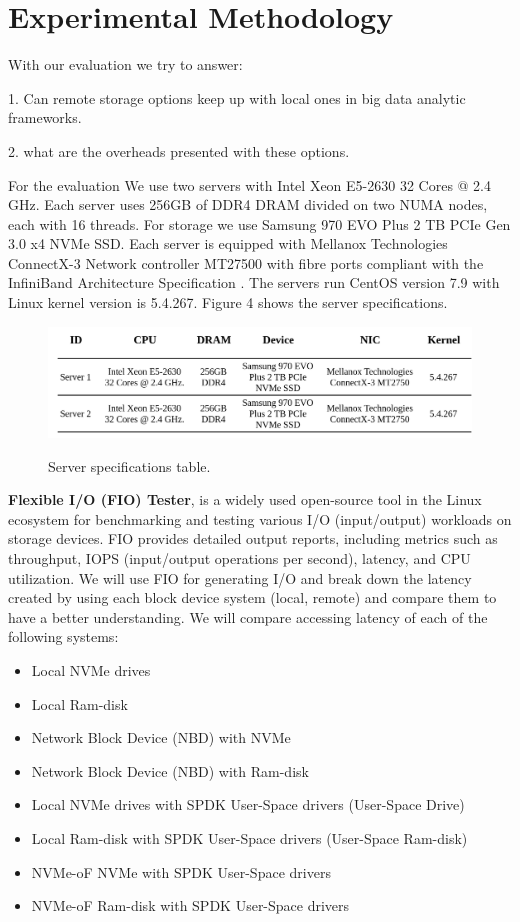 \vspace{9em}
\section{Experimental Methodology}
With our evaluation we try to answer: 

1. Can remote storage options keep up with local ones in big data analytic frameworks.

2. what are the overheads presented with these options.
\vspace{1em}

For the evaluation We use two servers with Intel Xeon E5-2630 32 Cores @ 2.4 GHz. Each server uses 256GB of DDR4 DRAM divided on two NUMA nodes, each with 16 threads. For storage we use Samsung 970 EVO Plus 2 TB PCIe Gen 3.0 x4 NVMe SSD. Each server is equipped with Mellanox Technologies ConnectX-3 Network controller MT27500 with fibre ports compliant with the InfiniBand Architecture Specification . The servers run CentOS version 7.9 with Linux kernel version is 5.4.267. Figure 4 shows the server specifications.
\begin{figure}[h]
\includegraphics[scale=0.2]{figures/server_specs.drawio.png}\\
\caption{Server specifications table.}
\end{figure}
\vspace{1em}

\textbf{Flexible I/O (FIO) Tester}, is a widely used open-source tool in the
Linux ecosystem for benchmarking and testing various I/O (input/output)
workloads on storage devices. FIO provides detailed output reports, including metrics such as
throughput, IOPS (input/output operations per second), latency, and CPU
utilization. We will use FIO for generating I/O  and break down the latency created by using each block device system (local, remote) and compare them to have a better understanding. We will compare accessing latency of each of the following systems:
\begin{itemize}
    \item Local NVMe drives
    \item Local Ram-disk
    \item Network Block Device (NBD) with NVMe
    \item Network Block Device (NBD) with Ram-disk
    \item Local NVMe drives with SPDK User-Space drivers (User-Space Drive)
    \item Local Ram-disk with SPDK User-Space drivers (User-Space Ram-disk)
    \item NVMe-oF NVMe with SPDK User-Space drivers
    \item NVMe-oF Ram-disk with SPDK User-Space drivers
\end{itemize}
\vspace{1em}


